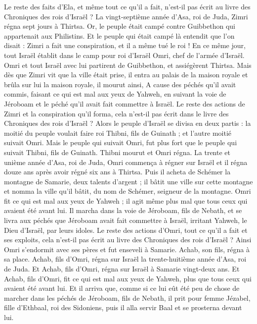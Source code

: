 \begin{multicols}{2}
Le reste des faits d'Ela, et même tout ce qu'il a fait, n'est-il pas écrit au livre des Chroniques des rois d'Israël ?
La vingt-septième année d'Asa, roi de Juda, Zimri régna sept jours à Thirtsa. Or, le peuple était campé contre Guibbethon qui appartenait aux Philistins.
Et le peuple qui était campé là entendit que l'on disait : Zimri a fait une conspiration, et il a même tué le roi ! En ce même jour, tout Israël établit dans le camp pour roi d’Israël Omri, chef de l'armée d'Israël.
Omri et tout Israël avec lui partirent de Guibbethon, et assiégèrent Thirtsa.
Mais dès que Zimri vit que la ville était prise, il entra au palais de la maison royale et brûla sur lui la maison royale, il mourut ainsi,
A cause des péchés qu’il avait commis, faisant ce qui est mal aux yeux de Yahweh, en suivant la voie de Jéroboam et le péché qu'il avait fait commettre à Israël.
Le reste des actions de Zimri et la conspiration qu'il forma, cela n’est-il pas écrit dans le livre des Chroniques des rois d'Israël ?
Alors le peuple d'Israël se divisa en deux partis : la moitié du peuple voulait faire roi Thibni, fils de Guinath ; et l'autre moitié suivait Omri.
Mais le peuple qui suivait Omri, fut plus fort que le peuple qui suivait Thibni, fils de Guinath. Thibni mourut et Omri régna.
La trente et unième année d'Asa, roi de Juda, Omri commença à régner sur Israël et il régna douze ans après avoir régné six ans à Thirtsa.
Puis il acheta de Schémer la montagne de Samarie, deux talents d'argent ; il bâtit une ville sur cette montagne et nomma la ville qu'il bâtit, du nom de Schémer, seigneur de la montagne.
Omri fit ce qui est mal aux yeux de Yahweh ; il agit même plus mal que tous ceux qui avaient été avant lui.
Il marcha dans la voie de Jéroboam, fils de Nebath, et se livra aux péchés que Jéroboam avait fait commettre à Israël, irritant Yahweh, le Dieu d'Israël, par leurs idoles.
Le reste des actions d’Omri, tout ce qu'il a fait et ses exploits, cela n’est-il pas écrit au livre des Chroniques des rois d'Israël ?
Ainsi Omri s'endormit avec ses pères et fut enseveli à Samarie. Achab, son fils, régna à sa place.
Achab, fils d’Omri, régna sur Israël la trente-huitième année d'Asa, roi de Juda. Et Achab, fils d’Omri, régna sur Israël à Samarie vingt-deux ans.
Et Achab, fils d’Omri, fit ce qui est mal aux yeux de Yahweh, plus que tous ceux qui avaient été avant lui.
Et il arriva que, comme si ce lui eût été peu de chose de marcher dans les péchés de Jéroboam, fils de Nebath, il prit pour femme Jézabel, fille d'Ethbaal, roi des Sidoniens, puis il alla servir Baal et se prosterna devant lui.

\end{multicols}
